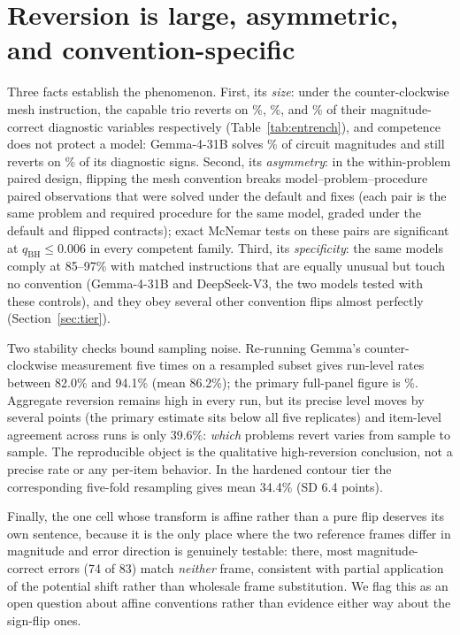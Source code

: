 \documentclass{article}
\begin{document}
\section{Reversion is large, asymmetric, and convention-specific}
\label{sec:pheno}
Three facts establish the phenomenon. First, its \emph{size}: under the
counter-clockwise mesh instruction, the capable trio reverts on
\ccwGptFive\%, \ccwGptOss\%, and \ccwGemma\% of their magnitude-correct diagnostic
variables respectively (Table~\ref{tab:entrench}), and competence does not protect
a model: Gemma-4-31B solves \vCircMagGemma\% of circuit magnitudes and still
reverts on \ccwGemma\% of its diagnostic signs. Second, its \emph{asymmetry}: in
the within-problem paired design, flipping the mesh convention breaks \bAgg{} model--problem--procedure paired
observations that were solved under the default and fixes \cAgg{} (each pair is
the same problem and required procedure for the same model, graded under the
default and flipped contracts); exact McNemar tests on these pairs are significant at $q_{\mathrm{BH}}\le 0.006$ in every
competent family. Third, its \emph{specificity}: the same models comply at
85--97\% with matched instructions that are equally unusual but touch no
convention (Gemma-4-31B and DeepSeek-V3, the two models tested with these
controls), and they obey several other convention flips almost perfectly
(Section~\ref{sec:tier}).

Two stability checks bound sampling noise. Re-running Gemma's counter-clockwise
measurement five times on a resampled subset gives run-level rates between 82.0\%
and 94.1\% (mean 86.2\%); the primary full-panel figure is \ccwGemma\%. Aggregate reversion remains high in every run, but its precise level moves by
several points (the primary estimate sits below all five replicates) and
item-level agreement across runs is only 39.6\%: \emph{which} problems revert
varies from sample to sample. The reproducible object is the qualitative
high-reversion conclusion, not a precise rate or any per-item behavior. In the hardened contour tier the
corresponding five-fold resampling gives mean 34.4\% (SD 6.4 points).

Finally, the one cell whose transform is affine rather than a pure flip deserves
its own sentence, because it is the only place where the two reference frames
differ in magnitude and error direction is genuinely testable: there, most
magnitude-correct errors (74 of 83) match \emph{neither} frame, consistent with
partial application of the potential shift rather than wholesale frame
substitution. We flag this as an open question about affine conventions rather
than evidence either way about the sign-flip ones.
\end{document}
